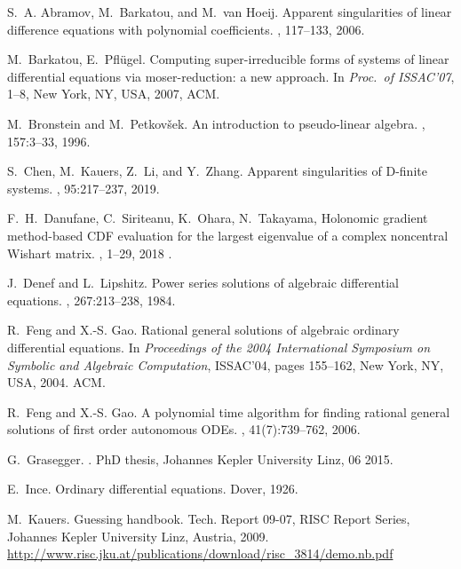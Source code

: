 \documentclass[10pt,a4paper]{article}
\begin{document}
\begin{thebibliography}{10}

S.~A. Abramov, M.~Barkatou, and M.~van Hoeij.
\newblock Apparent singularities of linear difference equations with polynomial
  coefficients.
, 117--133, 2006.

M.~Barkatou, E.~Pfl{\"u}gel. 
\newblock Computing super-irreducible forms of systems of linear differential equations via moser-reduction: a new approach.
\newblock In {\em Proc.\ of ISSAC'07},  1--8, New York, NY, USA, 2007, ACM.


M.~Bronstein and M.~Petkov{\v{s}}ek.
\newblock An introduction to pseudo-linear algebra.
, 157:3--33, 1996.
  
S.~Chen, M.~Kauers, Z.~Li, and Y.~Zhang.
\newblock Apparent singularities of {D}-finite systems.
, 95:217--237, 2019.
  
F.~H.~Danufane, C.~Siriteanu, K.~Ohara, N.~Takayama,
\newblock Holonomic gradient method-based CDF evaluation for the largest eigenvalue
of a complex noncentral Wishart matrix.
, 1--29, 2018 .

J.~Denef and L.~Lipshitz.
\newblock Power series solutions of algebraic differential equations.
, 267:213--238, 1984.

R.~Feng and X.-S. Gao.
\newblock Rational general solutions of algebraic ordinary differential
  equations.
\newblock In {\em Proceedings of the 2004 International Symposium on Symbolic
  and Algebraic Computation}, ISSAC'04, pages 155--162, New York, NY, USA,
  2004. ACM.

R.~Feng and X.-S. Gao.
\newblock A polynomial time algorithm for finding rational general solutions of
  first order autonomous {ODEs}.
, 41(7):739--762, 2006.

G.~Grasegger.
.
\newblock PhD thesis, Johannes Kepler University Linz, 06 2015.

E.~Ince.
\newblock Ordinary differential equations.
\newblock Dover, 1926.

M.~Kauers.
\newblock Guessing handbook.
\newblock Tech. Report 09-07, RISC Report Series, Johannes Kepler University Linz, Austria, 2009. \\
\href{http://www.risc.jku.at/publications/download/risc_3814/demo.nb.pdf}{http:/$\!$/www.risc.jku.at/publications/download/risc\_3814/demo.nb.pdf}



\end{thebibliography}
\end{document}
